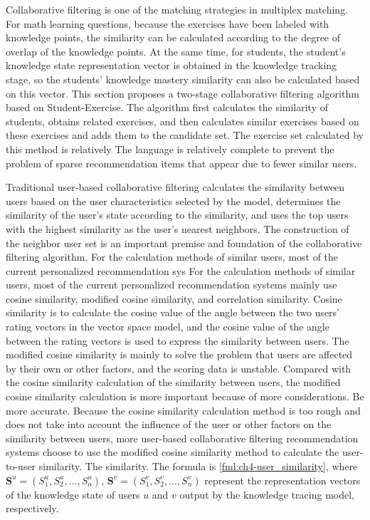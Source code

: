 Collaborative filtering is one of the matching strategies in multiplex matching. For math learning questions, because the exercises have been labeled with knowledge points, the similarity can be calculated according to the degree of overlap of the knowledge points. At the same time, for students, the student's knowledge state representation vector is obtained in the knowledge tracking stage, so the students' knowledge mastery similarity can also be calculated based on this vector. This section proposes a two-stage collaborative filtering algorithm based on Student-Exercise. The algorithm first calculates the similarity of students, obtains related exercises, and then calculates similar exercises based on these exercises and adds them to the candidate set. The exercise set calculated by this method is relatively The language is relatively complete to prevent the problem of sparse recommendation items that appear due to fewer similar users.

Traditional user-based collaborative filtering calculates the similarity between users based on the user characteristics selected by the model, determines the similarity of the user's state according to the similarity, and uses the top users with the highest similarity as the user's nearest neighbors. The construction of the neighbor user set is an important premise and foundation of the collaborative filtering algorithm. For the calculation methods of similar users, most of the current personalized recommendation sys For the calculation methods of similar users, most of the current personalized recommendation systems mainly use cosine similarity, modified cosine similarity, and correlation similarity. Cosine similarity is to calculate the cosine value of the angle between the two users' rating vectors in the vector space model, and the cosine value of the angle between the rating vectors is used to express the similarity between users. The modified cosine similarity is mainly to solve the problem that users are affected by their own or other factors, and the scoring data is unstable. Compared with the cosine similarity calculation of the similarity between users, the modified cosine similarity calculation is more important because of more considerations. Be more accurate. Because the cosine similarity calculation method is too rough and does not take into account the influence of the user or other factors on the similarity between users, more user-based collaborative filtering recommendation systems choose to use the modified cosine similarity method to calculate the user-to-user similarity. The similarity. The formula is \ref{fml:ch4-user_similarity}, where \(\mathbf{S}^u=(S^u_1,S^u_2,\ldots,S^u_n)\), \(\mathbf{S}^v=(S^v_1,S^v_2,\ldots, S^v_n)\) represent the representation vectors of the knowledge state of users \(u\) and \(v\) output by the knowledge tracing model, respectively.

